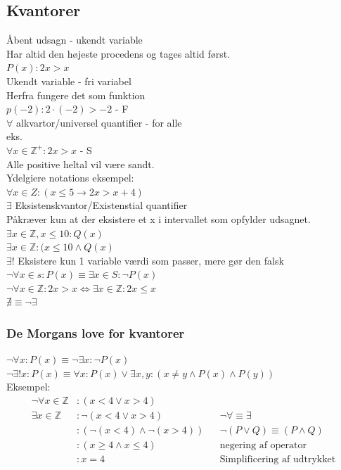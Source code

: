 \documentclass[12pt, a4paper]{article}
\begin{document}
			\subsection{Kvantorer}
				Åbent udsagn - ukendt variable\\
				Har altid den højeste procedens og tages altid først.\\
				$P(x): 2x > x$\\
				Ukendt variable - fri variabel\\
				Herfra fungere det som funktion\\
				$p(-2): 2\cdot (-2)>-2$ - F\\
				$\forall$ alkvartor/universel quantifier - for alle\\
				eks.\\
				$\forall x \in \mathbb{Z}^+ : 2x > x$ - S\\
				Alle positive heltal vil være sandt.\\
				Ydelgiere notations eksempel:\\
				$\forall x \in Z: (x \leq 5 \rightarrow 2x > x +4)$\\
				$\exists$ Eksistenskvantor/Existenstial quantifier\\
				Påkræver kun at der eksistere et x i intervallet som opfylder udsagnet.\\
				$\exists x \in \mathbb{Z}, x\leq 10: Q(x)$\\
				$\exists x \in \mathbb{Z}: (x\leq 10 \land Q(x)$\\
				$\exists !$ Eksistere kun 1 variable værdi som passer, mere gør den falsk\\
				$\neg \forall x \in s: P(x)\equiv \exists x \in S : \neg P(x)$\\
				$\neg \forall x \in \mathbb{Z} : 2x>x \iff \exists x \in \mathbb{Z} : 2x \leq x$\\
				$\nexists \equiv \neg \exists$
				\subsubsection{De Morgans love for kvantorer}
					$\neg \forall x: P(x) \equiv \neg \exists x: \neg P(x)$\\
					$\neg \exists ! x : P(x) \equiv \forall x: P(x) \lor \exists x,y:(x\neq y \land P(x) \land P(y))$\\[5mm]
					Eksempel:
					\begin{align*}
						\neg \forall x \in \mathbb{Z} &:(x<4 \lor x > 4)\\
						\exists x \in \mathbb{Z} &: \neg(x<4 \lor x >4 ) && \neg\forall \equiv \exists\\
								 &: (\neg(x<4) \land \neg (x>4)) && \neg (P \lor Q)\equiv (P \land Q)\\
								 &: (x \geq 4 \land x \leq 4) && \text{negering af operator}\\
								 &: x = 4 && \text{Simplificering af udtrykket}
					\end{align*}
\end{document}
